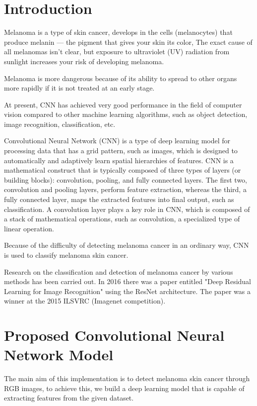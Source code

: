 \section{Introduction}
    Melanoma is a type of skin cancer, develops in the cells (melanocytes) that produce melanin — the pigment that gives your skin its color, The exact cause of all melanomas isn't clear, but exposure to ultraviolet (UV) radiation from sunlight increases your risk of developing melanoma. ~\cite{mayo2022}

    Melanoma is more dangerous because of its ability to spread to other organs more rapidly if it is not treated at an early stage. ~\cite{scfm2022}

    At present, CNN has achieved very good performance in the field of computer vision compared to other machine learning algorithms, such as object detection, image recognition, classification, etc. 

    Convolutional Neural Network (CNN) is a type of deep learning model for processing data that has a grid pattern, such as images, which is designed to automatically and adaptively learn spatial hierarchies of features. CNN is a mathematical construct that is typically composed of three types of layers (or building blocks): convolution, pooling, and fully connected layers. The first two, convolution and pooling layers, perform feature extraction, whereas the third, a fully connected layer, maps the extracted features into final output, such as classification. A convolution layer plays a key role in CNN, which is composed of a stack of mathematical operations, such as convolution, a specialized type of linear operation. \cite{Yamashita2018}

    Because of the difficulty of detecting melanoma cancer in an ordinary way, CNN is used to classify melanoma skin cancer.

    Research on the classification and detection of melanoma cancer by various methods has been carried out. In 2016 there was a paper entitled "Deep Residual Learning for Image Recognition" using the ResNet architecture. The paper was a winner at the 2015 ILSVRC (Imagenet competition). ~\cite{Arief2019}


\section{Proposed Convolutional Neural Network Model}
    The main aim of this implementation is to detect melanoma skin cancer through RGB images, to achieve this, we build a deep learning model that is capable of extracting features from the given dataset.

